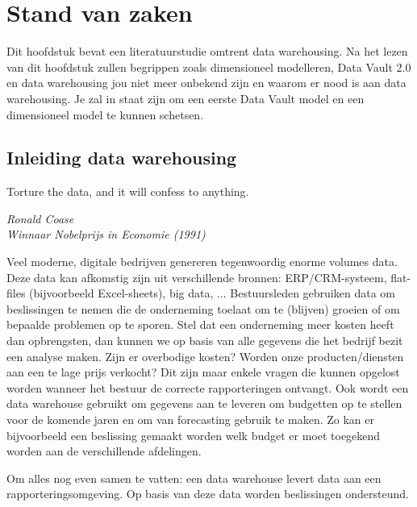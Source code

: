 \chapter{Stand van zaken}
\label{ch:stand-van-zaken}



Dit hoofdstuk bevat een literatuurstudie omtrent data warehousing. Na het lezen van dit hoofdstuk zullen begrippen zoals dimensioneel modelleren, Data Vault 2.0 en data warehousing jou niet meer onbekend zijn en waarom er nood is aan data warehousing. Je zal in staat zijn om een eerste Data Vault model en een dimensioneel model te kunnen schetsen.

\section{Inleiding data warehousing}

\epigraph{Torture the data, and it will confess to anything. }{\textit{Ronald Coase \\ Winnaar Nobelprijs in Economie (1991)}}

Veel moderne, digitale bedrijven genereren tegenwoordig enorme volumes data. Deze data kan afkomstig zijn uit verschillende bronnen: ERP/CRM-systeem, flat-files (bijvoorbeeld Excel-sheets), big data, ... Bestuursleden gebruiken data om beslissingen te nemen die de onderneming toelaat om te (blijven) groeien of om bepaalde problemen op te sporen. Stel dat een onderneming meer kosten heeft dan opbrengsten, dan kunnen we op basis van alle gegevens die het bedrijf bezit een analyse maken. Zijn er overbodige kosten? Worden onze producten/diensten aan een te lage prijs verkocht? Dit zijn maar enkele vragen die kunnen opgelost worden wanneer het bestuur de correcte rapporteringen ontvangt. Ook wordt een data warehouse gebruikt om gegevens aan te leveren om budgetten op te stellen voor de komende jaren en om van forecasting gebruik te maken. Zo kan er bijvoorbeeld een beslissing gemaakt worden welk budget er moet toegekend worden aan de verschillende afdelingen. 

Om alles nog even samen te vatten: een data warehouse levert data aan een rapporteringsomgeving. Op basis van deze data worden beslissingen ondersteund.

